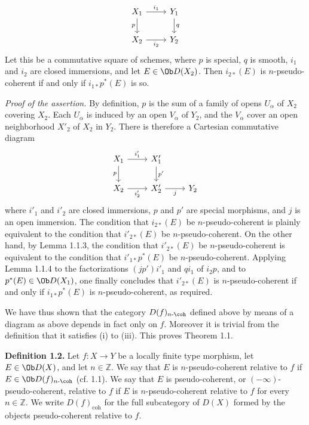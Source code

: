 \documentclass[11pt]{article}
\begin{document}
\[
\begin{tikzcd}
X_1 \arrow[r,"i_1"] \arrow[d,"p"'] & Y_1 \arrow[d,"q"]\\
X_2 \arrow[r,"i_2"'] & Y_2
\end{tikzcd}
\]
Let this be a commutative square of schemes, where \(p\) is special, \(q\) is smooth, \(i_1\) and \(i_2\) are closed immersions, and let \(E\in \Ob D(X_2)\). Then \(i_{2*}(E)\) is \(n\)-pseudo-coherent if and only if \(i_{1*}p^*(E)\) is so.

\emph{Proof of the assertion.} By definition, \(p\) is the sum of a family of opens \(U_\alpha\) of \(X_2\) covering \(X_2\). Each \(U_\alpha\) is induced by an open \(V_\alpha\) of \(Y_2\), and the \(V_\alpha\) cover an open neighborhood \(X'_2\) of \(X_2\) in \(Y_2\). There is therefore a Cartesian commutative diagram
\[
\begin{tikzcd}
X_1 \arrow[r,"i'_1"] \arrow[d,"p"'] & X'_1 \arrow[d,"p'"]\\
X_2 \arrow[r,"i'_2"'] & X'_2 \arrow[r,"j"'] & Y_2
\end{tikzcd}
\]
where \(i'_1\) and \(i'_2\) are closed immersions, \(p\) and \(p'\) are special morphisms, and \(j\) is an open immersion. The condition that \(i_{2*}(E)\) be \(n\)-pseudo-coherent is plainly equivalent to the condition that \(i'_{2*}(E)\) be \(n\)-pseudo-coherent. On the other hand, by Lemma 1.1.3, the condition that \(i'_{2*}(E)\) be \(n\)-pseudo-coherent is equivalent to the condition that \(i'_{1*}p^*(E)\) be \(n\)-pseudo-coherent. Applying Lemma 1.1.4 to the factorizations \((jp')i'_1\) and \(qi_1\) of \(i_2p\), and to \(p^*(E)\in \Ob D(X_1)\), one finally concludes that \(i'_{2*}(E)\) is \(n\)-pseudo-coherent if and only if \(i_{1*}p^*(E)\) is \(n\)-pseudo-coherent, as required.

We have thus shown that the category \(D(f)_{n\text{-}\coh}\) defined above by means of a diagram as above depends in fact only on \(f\). Moreover it is trivial from the definition that it satisfies (i) to (iii). This proves Theorem 1.1.

\textbf{Definition 1.2.} Let \(f:X\to Y\) be a locally finite type morphism, let \(E\in \Ob D(X)\), and let \(n\in\mathbb Z\). We say that \(E\) is \(n\)-pseudo-coherent relative to \(f\) if \(E\in \Ob D(f)_{n\text{-}\coh}\) (cf. 1.1). We say that \(E\) is pseudo-coherent, or \((-\infty)\)-pseudo-coherent, relative to \(f\) if \(E\) is \(n\)-pseudo-coherent relative to \(f\) for every \(n\in\mathbb Z\). We write \(D(f)_{\mathrm{coh}}\) for the full subcategory of \(D(X)\) formed by the objects pseudo-coherent relative to \(f\).
\end{document}
